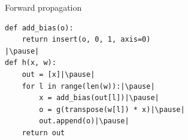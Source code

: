\begin{frame}[fragile]
  \begin{block}{Forward propagation}
    \begin{lstlisting}
def add_bias(o):
    return insert(o, 0, 1, axis=0)
|\pause|
def h(x, w):
    out = [x]|\pause|
    for l in range(len(w)):|\pause|
        x = add_bias(out[l])|\pause|
        o = g(transpose(w[l]) * x)|\pause|
        out.append(o)|\pause|
    return out
  \end{lstlisting}
  \end{block}
\end{frame}


